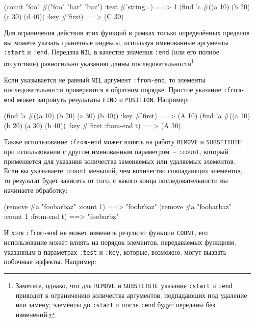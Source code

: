 \begin{myverb}
(count "foo" #("foo" "bar" "baz") :test #'string=)    ==> 1
(find 'c #((a 10) (b 20) (c 30) (d 40)) :key #'first) ==> (C 30)
\end{myverb}

Для ограничения действия этих функций в рамках только определённых пределов вы можете
указать граничные индексы, используя именованные аргументы \lstinline{:start} и \lstinline{:end}.
Передача \lstinline{NIL} в качестве значения \lstinline{:end} (или его полное отсутствие)
равносильно указанию длины последовательности\footnote{Заметьте, однако, что для
  \lstinline{REMOVE} и \lstinline{SUBSTITUTE} указание \lstinline{:start} и \lstinline{:end} приводит к
  ограничению количества аргументов, подпадающих под удаление или замену; элементы до
  \lstinline{:start} и после \lstinline{:end} будут переданы без изменений.}\hspace{\footnotenegspace}.

Если указывается не равный \lstinline{NIL} аргумент \lstinline{:from-end}, то элементы
последовательности проверяются в обратном порядке.  Простое указание \lstinline{:from-end}
может затронуть результаты \lstinline{FIND} и \lstinline{POSITION}.  Например:

\begin{myverb}
(find 'a #((a 10) (b 20) (a 30) (b 40)) :key #'first)             ==> (A 10)
(find 'a #((a 10) (b 20) (a 30) (b 40)) :key #'first :from-end t) ==> (A 30)
\end{myverb}

Также использование \lstinline{:from-end} может влиять на работу \lstinline{REMOVE} и
\lstinline{SUBSTITUTE} при использовании с другим именованным параметром~-- \lstinline{:count},
который применяется для указания количества заменяемых или удаляемых элементов.  Если вы
указываете \lstinline{:count} меньший, чем количество совпадающих элементов, то результат будет
зависеть от того, с какого конца последовательности вы начинаете обработку:

\begin{myverb}
(remove #\bslash{}a "foobarbaz" :count 1)             ==> "foobrbaz"
(remove #\bslash{}a "foobarbaz" :count 1 :from-end t) ==> "foobarbz"
\end{myverb}

И хотя \lstinline{:from-end} не может изменить результат функции \lstinline{COUNT}, его
использование может влиять на порядок элементов, передаваемых функциям, указанным в
параметрах \lstinline{:test} и \lstinline{:key}, которые, возможно, могут вызвать побочные эффекты.
Например:

